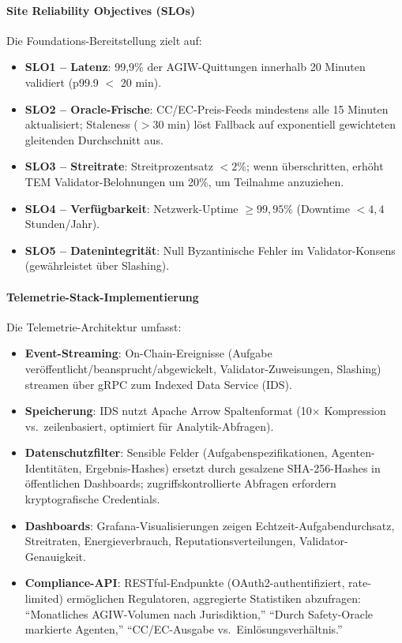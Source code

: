 \documentclass[11pt]{article}
\begin{document}
\paragraph{Site Reliability Objectives (SLOs)} Die Foundations-Bereitstellung zielt auf:
\begin{itemize}[noitemsep]
  \item \textbf{SLO1 -- Latenz}: 99,9\% der AGIW-Quittungen innerhalb 20 Minuten validiert (p99.9 $<$ 20 min).
  \item \textbf{SLO2 -- Oracle-Frische}: CC/EC-Preis-Feeds mindestens alle 15 Minuten aktualisiert; Staleness ($>30$ min) löst Fallback auf exponentiell gewichteten gleitenden Durchschnitt aus.
  \item \textbf{SLO3 -- Streitrate}: Streitprozentsatz $<2\%$; wenn überschritten, erhöht TEM Validator-Belohnungen um 20\%, um Teilnahme anzuziehen.
  \item \textbf{SLO4 -- Verfügbarkeit}: Netzwerk-Uptime $\geq 99,95\%$ (Downtime $<4,4$ Stunden/Jahr).
  \item \textbf{SLO5 -- Datenintegrität}: Null Byzantinische Fehler im Validator-Konsens (gewährleistet über Slashing).
\end{itemize}

\paragraph{Telemetrie-Stack-Implementierung} Die Telemetrie-Architektur umfasst:
\begin{itemize}[noitemsep]
  \item \textbf{Event-Streaming}: On-Chain-Ereignisse (Aufgabe veröffentlicht/beansprucht/abgewickelt, Validator-Zuweisungen, Slashing) streamen über gRPC zum Indexed Data Service (IDS).
  \item \textbf{Speicherung}: IDS nutzt Apache Arrow Spaltenformat (10$\times$ Kompression vs.\ zeilenbasiert, optimiert für Analytik-Abfragen).
  \item \textbf{Datenschutzfilter}: Sensible Felder (Aufgabenspezifikationen, Agenten-Identitäten, Ergebnis-Hashes) ersetzt durch gesalzene SHA-256-Hashes in öffentlichen Dashboards; zugriffskontrollierte Abfragen erfordern kryptografische Credentials.
  \item \textbf{Dashboards}: Grafana-Visualisierungen zeigen Echtzeit-Aufgabendurchsatz, Streitraten, Energieverbrauch, Reputationsverteilungen, Validator-Genauigkeit.
  \item \textbf{Compliance-API}: RESTful-Endpunkte (OAuth2-authentifiziert, rate-limited) ermöglichen Regulatoren, aggregierte Statistiken abzufragen: ``Monatliches AGIW-Volumen nach Jurisdiktion,'' ``Durch Safety-Oracle markierte Agenten,'' ``CC/EC-Ausgabe vs.\ Einlösungsverhältnis.''
\end{itemize}
\end{document}

